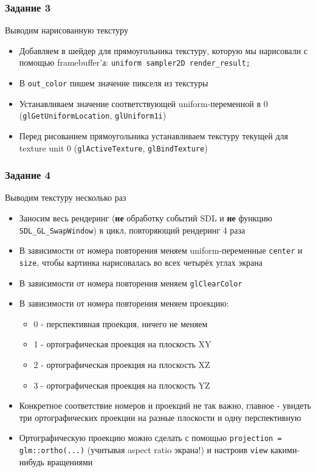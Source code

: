 \documentclass{beamer}
\begin{document}
\begin{frame}[fragile]
\frametitle{Задание 3}
Выводим нарисованную текстуру
\begin{itemize}
\item Добавляем в шейдер для прямоугольника текстуру, которую мы нарисовали с помощью framebuffer'а: \verb|uniform sampler2D render_result;|
\pause
\item В \verb|out_color| пишем значение пикселя из текстуры
\pause
\item Устанавливаем значение соответствующей uniform-переменной в 0 (\verb|glGetUniformLocation|, \verb|glUniform1i|)
\pause
\item Перед рисованием прямоугольника устанавливаем текстуру текущей для texture unit 0 (\verb|glActiveTexture|, \verb|glBindTexture|)
\end{itemize}
\end{frame}

\begin{frame}[fragile]
\frametitle{Задание 4}
\fontsize{10pt}{10pt}
Выводим текстуру несколько раз
\begin{itemize}
\item Заносим весь рендеринг (\textbf{не} обработку событий SDL и \textbf{не} функцию \verb|SDL_GL_SwapWindow|) в цикл, повторяющий рендеринг 4 раза
\pause
\item В зависимости от номера повторения меняем uniform-переменные \verb|center| и \verb|size|, чтобы картинка нарисовалась во всех четырёх углах экрана
\pause
\item В зависимости от номера повторения меняем \verb|glClearColor|
\pause
\item В зависимости от номера повторения меняем проекцию:
\begin{itemize}
\item 0 - перспективная проекция, ничего не меняем
\item 1 - ортографическая проекция на плоскость XY
\item 2 - ортографическая проекция на плоскость XZ
\item 3 - ортографическая проекция на плоскость YZ
\end{itemize}
\pause
\item Конкретное соответствие номеров и проекций не так важно, главное - увидеть три ортографических проекции на разные плоскости и одну перспективную
\pause
\item Ортографическую проекцию можно сделать с помощью \verb|projection = glm::ortho(...)| (учитывая aspect ratio экрана!) и настроив \verb|view| какими-нибудь вращениями
\end{itemize}
\end{frame}
\end{document}
